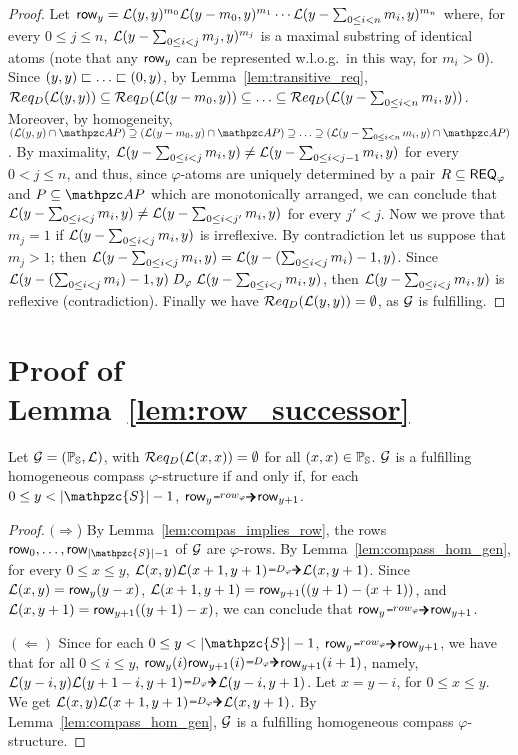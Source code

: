 \begin{proof}
Let  $\text{{\sffamily row}}_y=\mathcal{L}(y,y)^{m_0}\mathcal{L}(y- m_0, y )^{m_1}\cdots\mathcal{L}(y - \sum_{0\leq i< n} m_i, y)^{m_n}$ 
where, for every $0\leq j\leq n$, $\mathcal{L}(y - \sum_{0\leq i< j} m_j, y)^{m_j}$ is a maximal substring of identical atoms (note that any $\text{{\sffamily row}}_y$ can be represented w.l.o.g.\  in this way, for $m_i> 0$). 
Since $(y,y) \sqsubset  \ldots \sqsubset (0,y)$, by Lemma~\ref{lem:transitive_req}, $\mathcal{R} eq_D(\mathcal{L}(y,y))\subseteq \mathcal{R} eq_D( \mathcal{L}(y- m_0, y ))\subseteq\ldots \subseteq \mathcal{R} eq_D(\mathcal{L}(y - \sum_{0\leq i< n} m_i, y))$.
Moreover, by homogeneity, $(\cL(y,y)\cap \AP) \supseteq (\cL(y- m_0, y )\cap \AP)\supseteq \ldots \supseteq(\cL(y - \sum_{0\leq i< n} m_i, y)\cap \AP )$. 
By maximality, $\mathcal{L}(y - \sum_{0\leq i< j} m_i, y)\neq \mathcal{L}(y - \sum_{0\leq i< j-1} m_i, y)$ for every $0<j\leq n$, and thus, since $\varphi$-atoms are 
uniquely determined by a pair $R\subseteq \mathsf{REQ}_{\varphi}$ and $P\subseteq \AP$ which are monotonically arranged, we can conclude that $\mathcal{L}(y - \sum_{0\leq i< j} m_i, y)\neq \mathcal{L}(y - \sum_{0\leq i< j'} m_i, y)$ for every $j'< j$. Now we prove that $m_j=1$ if    $\mathcal{L}(y - \sum_{0\leq i< j} m_i, y)$
is irreflexive. By contradiction let us suppose that $m_j>1$; then $\mathcal{L}(y - \sum_{0\leq i< j} m_i, y)=
\mathcal{L}(y - (\sum_{0\leq i< j} m_i)-1, y)$. Since $\mathcal{L}(y - (\sum_{0\leq i< j} m_i)-1, y)\mathrel{D_\varphi} \mathcal{L}(y - \sum_{0\leq i< j} m_i, y)
$, then $\mathcal{L}(y - \sum_{0\leq i< j} m_i, y)$ is reflexive (contradiction).
Finally we have $\mathcal{R} eq_D(\mathcal{L}(y,y))=\emptyset$, as $\mathcal{G}$ is fulfilling.
\end{proof}


\section{Proof of Lemma~\ref{lem:row_successor}}\label{proof:lem:row_successor}

\begin{lemma*}[\ref{lem:row_successor}]
Let $\mathcal{G}=(\mathbb{P}_{\mathbb{S}},\mathcal{L})$, with $\mathcal{R} eq_D(\mathcal{L}(x,x))=\emptyset$ for all $(x,x)\in\mathbb{P}_{\mathbb{S}}$. $\mathcal{G}$ is a fulfilling homogeneous compass $\varphi$-structure
if and only if, for each $0\leq y < |\mathpzc{S}| -1$, $\row_y \rownext \row_{y+1}$.
\end{lemma*}

\begin{proof}
$(\Rightarrow$) By Lemma~\ref{lem:compas_implies_row}, the rows $\row_0,\ldots,\row_{|\mathpzc{S}|-1}$ of $\mathcal{G}$ are $\varphi$-rows.
By Lemma~\ref{lem:compass_hom_gen}, for every $0\leq x\leq y$, 
$\cL(x,y)\cL(x+1,y+1)\genDphi \cL(x, y+1)$. Since $\mathcal{L}(x,y)= \text{{\sffamily row}}_y(y-x)$,
$\mathcal{L}(x+1, y+1)= \text{{\sffamily row}}_{y+1}((y+1)- (x +1))$, and $\mathcal{L}(x,y+1)= \text{{\sffamily row}}_{y+1}((y+1)- x )$,
we can conclude that $\row_y \rownext \row_{y+1}$.

$(\Leftarrow)$ Since for each $0\leq y < |\mathpzc{S}| -1$, $\row_y \rownext \row_{y+1}$, we have that for all $0\leq i \leq y$,
$\row_y(i)\row_{y+1}(i) \genDphi \row_{y+1}(i+1)$, namely, $\cL(y-i,y)\cL(y+1-i,y+1)\genDphi\cL(y-i,y+1)$. Let $x=y-i$, for $0\leq x\leq y$. We get $\cL(x,y)\cL(x+1,y+1)\genDphi\cL(x,y+1)$. By Lemma~\ref{lem:compass_hom_gen}, $\mathcal{G}$ is a fulfilling homogeneous compass $\varphi$-structure.
\end{proof}



